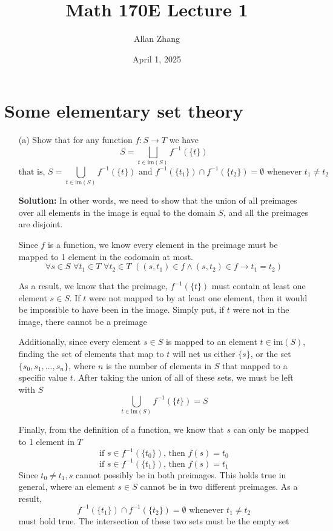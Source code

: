 \documentclass[hidelinks]{article}
\title{\textbf{Math 170E Lecture 1}}
\author{Allan Zhang}
\date{April 1, 2025}
\begin{document}
\hypersetup{bookmarksnumbered=true,}
\pagecolor{white}
\color{black}
\maketitle 
\section*{Some elementary set theory}
\begin{itemize}
    \item[(a)] Show that for any function $f: S \rightarrow T$ we have
        \[
            S = \bigsqcup_{t \in \text{im}(S)} f^{-1}(\{t\}) 
        \]
        $$\text{that is, } S = \bigcup_{t\in \text{im}(S)}f^{-1}(\{t\}) \text{ and } f^{-1}(\{t_1\}) \cap f^{-1}(\{t_2\}) = \emptyset \text{ whenever } t_1 \neq t_2$$
        \item[ ] 
        \textbf{Solution:} In other words, we need to show that the union of all preimages over all elements in the image is equal to the domain $S$, and all the preimages are disjoint.
        \vspace{0.2cm} 

        Since $f$ is a function, we know every element in the preimage must be mapped to 1 element in the codomain at most. 
        \[
            \forall s \in S \, \,\forall t_1 \in T \, \,\forall t_2 \in T \, \, ((s, t_1) \in f \wedge (s, t_2) \in f \rightarrow t_1 = t_2)
        \]
        
        As a result, we know that the preimage, $f^{-1}(\{t\})$ must contain at least one element $s \in S$. If $t$ were not mapped to by at least one element, then it would be impossible to have been in the image. Simply put, if $t$ were not in the image, there cannot be a preimage 
        \vspace{0.2cm} 

        Additionally, since every element $s \in S$ is mapped to an element $t \in \text{im}(S)$, finding the set of elements that map to $t$ will net us either $\{s\}$, or the set $\{s_0, s_1, ..., s_n\}$, where $n$ is the number of elements in $S$ that mapped to a specific value $t$. After taking the union of all of these sets, we must be left with $S$  
        \[
            \bigcup_{t \in \text{im}(S)} f^{-1}(\{t\}) = S
        \]
        
        Finally, from the definition of a function, we know that $s$ can only be mapped to 1 element in $T$
        \[
            \text{if }s \in f^{-1}(\{t_0\}) \text{, then } f(s) = t_0 \]\[
            \text{if }s \in f^{-1}(\{t_1\}) \text{, then } f(s) = t_1 \]\[
        \]
        Since $t_0 \neq t_1, s$ cannot possibly be in both preimages. This holds true in general, where an element $s \in S$ cannot be in two different preimages. As a result, 
        \[
        f^{-1}(\{t_1\}) \cap f^{-1}(\{t_2\}) = \emptyset \text{ whenever } t_1 \neq t_2
        \]
        must hold true. The intersection of these two sets must be the empty set
        \vspace{0.2cm} 
        

\end{itemize}
\end{document}
